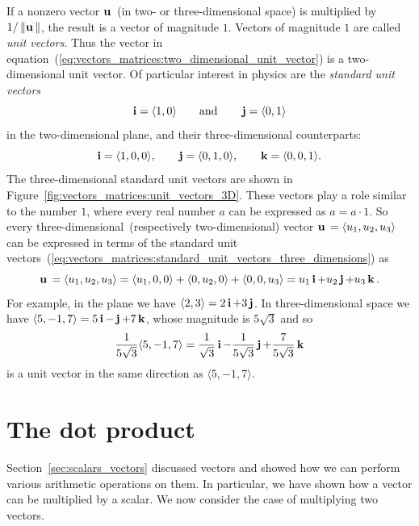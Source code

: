 If a nonzero vector $\operatorname*{\mathbf{u}}{}$ (in two- or three-dimensional space) is
multiplied by $1 / \left\Arrowvert \operatorname*{\mathbf{u}}{} \right\Arrowvert$, the result is a vector
of magnitude $1$. Vectors of magnitude $1$ are called
\emph{unit vectors}. Thus the vector in
equation~(\ref{eq:vectors_matrices:two_dimensional_unit_vector}) is a
two-dimensional unit vector. Of particular interest in physics are the
\emph{standard unit vectors}
\[
\operatorname*{\mathbf{i}} = \langle 1, 0 \rangle
\qquad\text{and}\qquad
\operatorname*{\mathbf{j}} = \langle 0, 1 \rangle
\]
in the two-dimensional plane, and their three-dimensional
counterparts:
%
\begin{equation}
\label{eq:vectors_matrices:standard_unit_vectors_three_dimensions}
\operatorname*{\mathbf{i}} = \langle 1, 0, 0 \rangle, \qquad
\operatorname*{\mathbf{j}} = \langle 0, 1, 0 \rangle, \qquad
\operatorname*{\mathbf{k}} = \langle 0, 0, 1 \rangle.
\end{equation}
%
The three-dimensional standard unit vectors are shown in
Figure~\ref{fig:vectors_matrices:unit_vectors_3D}. These vectors play
a role similar to the number $1$, where every real number $a$ can be
expressed as $a = a \cdot 1$. So every three-dimensional~(respectively
two-dimensional) vector $\operatorname*{\mathbf{u}}{} = \langle u_1, u_2, u_3 \rangle$ can be
expressed in terms of the standard unit
vectors~(\ref{eq:vectors_matrices:standard_unit_vectors_three_dimensions})
as
\[
\operatorname*{\mathbf{u}}{}
=
\langle u_1, u_2, u_3 \rangle
=
\langle u_1, 0, 0 \rangle +
\langle 0, u_2, 0 \rangle + \langle 0, 0, u_3 \rangle
=
u_1 \operatorname*{\mathbf{i}} + u_2 \operatorname*{\mathbf{j}} + u_3 \operatorname*{\mathbf{k}}.
\]
For example, in the plane we have
$\langle 2, 3 \rangle = 2\operatorname*{\mathbf{i}} + 3 \operatorname*{\mathbf{j}}$. In three-dimensional space
we have $\langle 5, -1, 7 \rangle = 5 \operatorname*{\mathbf{i}} - \operatorname*{\mathbf{j}} + 7 \operatorname*{\mathbf{k}}$, whose
magnitude is $5\sqrt{3}$ and so
\[
\frac{1}{5\sqrt{3}} \langle 5, -1, 7 \rangle
=
\frac{1}{\sqrt{3}}\operatorname*{\mathbf{i}}
-
\frac{1}{5\sqrt{3}}\operatorname*{\mathbf{j}}
+
\frac{7}{5\sqrt{3}}\operatorname*{\mathbf{k}}
\]
is a unit vector in the same direction as $\langle 5, -1, 7 \rangle$.



\section{The dot product}
\label{sec:dot_product}

Section~\ref{sec:scalars_vectors} discussed vectors and
showed how we can perform various arithmetic operations on them. In
particular, we have shown how a vector can be multiplied by a
scalar. We now consider the case of multiplying two vectors.


